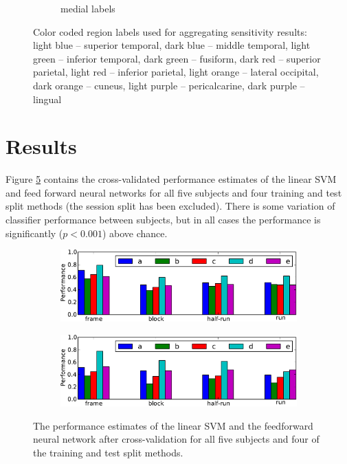 \documentclass[authoryear]{elsarticle}
\begin{document}
\begin{figure}
\begin{subfigure}{0.4\textwidth}
\caption{medial labels}
\label{fig:medial-labels}
\end{subfigure}
\caption{Color coded region labels used for aggregating sensitivity results: light blue -- superior temporal, dark blue -- middle temporal, light green -- inferior temporal, dark green -- fusiform, dark red -- superior parietal, light red -- inferior parietal, light orange -- lateral occipital, dark orange -- cuneus, light purple -- pericalcarine, dark purple -- lingual}
\label{fig:labels}
\end{figure}

\section{Results}
Figure \ref{fig:performance-graph} contains the cross-validated
performance estimates of the linear SVM and feed forward neural networks for all five subjects and four training and test split methods (the session split has been excluded).
There is some variation of classifier performance between subjects, but in all cases the performance is significantly ($p < 0.001$) above chance. 

\begin{figure}
\centering
\begin{subfigure}{0.8\textwidth}
\centering
\includegraphics[width=\textwidth]{figures/svm-performance-graph}
\caption{}
\label{fig:svm-performance-graph}
\end{subfigure}
\begin{subfigure}{0.8\textwidth}
\centering
\includegraphics[width=\textwidth]{figures/nn-performance-graph}
\caption{}
\label{fig:nn-performance-graph}
\end{subfigure}
\caption{The performance estimates of the  linear SVM and the  feedforward neural network after cross-validation for all five subjects and four of the training and test split methods. }
\label{fig:performance-graph}
\end{figure}
\end{document}
